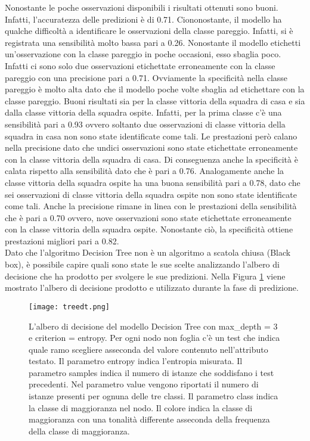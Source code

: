 Nonostante le poche osservazioni disponibili i risultati ottenuti sono buoni. Infatti, l'accuratezza delle predizioni è di 0.71. Ciononostante, il modello ha qualche difficoltà a identificare le osservazioni della classe pareggio. Infatti, si è registrata una sensibilità molto bassa pari a 0.26. Nonostante il modello etichetti un'osservazione con la classe pareggio in poche occasioni, esso sbaglia poco. Infatti ci sono solo due osservazioni etichettate erroneamente con la classe pareggio con una precisione pari a 0.71. Ovviamente la specificità nella classe pareggio è molto alta dato che il modello poche volte sbaglia ad etichettare con la classe pareggio. Buoni risultati sia per la classe vittoria della squadra di casa e sia dalla classe vittoria della squadra ospite. Infatti, per la prima classe c'è una sensibilità pari a 0.93 ovvero soltanto due osservazioni di classe vittoria della squadra in casa non sono state identificate come tali. Le prestazioni però calano nella precisione dato che undici osservazioni sono state etichettate erroneamente con la classe vittoria della squadra di casa. Di conseguenza anche la specificità è calata rispetto alla sensibilità dato che è pari a 0.76. Analogamente anche la classe vittoria della squadra ospite ha una buona sensibilità pari a 0.78, dato che sei osservazioni di classe vittoria della squadra ospite non sono state identificate come tali. Anche la precisione rimane in linea con le prestazioni della sensibilità che è pari a 0.70 ovvero, nove osservazioni sono state etichettate erroneamente con la classe vittoria della squadra ospite. Nonostante ciò, la specificità ottiene prestazioni migliori pari a 0.82.\\
Dato che l'algoritmo Decision Tree non è un algoritmo a scatola chiusa (Black box), è possibile capire quali sono state le sue scelte analizzando l'albero di decisione che ha prodotto per svolgere le sue predizioni. Nella Figura \ref{fig:dttree} viene mostrato l'albero di decisione prodotto e utilizzato durante la fase di predizione.
\begin{figure}[h]
	\begin{center}
		\texttt{[image: treedt.png]}
		\caption{L'albero di decisione del modello Decision Tree con \textsf{max\_dept}h = 3 e \textsf{criterion} = entropy. Per ogni nodo non foglia c'è un test che indica quale ramo scegliere asseconda del valore contenuto nell'attributo testato. Il parametro \textsf{entropy} indica l'entropia misurata. Il parametro \textsf{samples} indica il numero di istanze che soddisfano i test precedenti. Nel parametro \textsf{value} vengono riportati il numero di istanze presenti per ognuna delle tre classi. Il parametro \textsf{class} indica la classe di maggioranza nel nodo. Il colore indica la classe di maggioranza con una tonalità differente asseconda della frequenza della classe di maggioranza.
		} 
		\label{fig:dttree}
	\end{center}
\end{figure}

